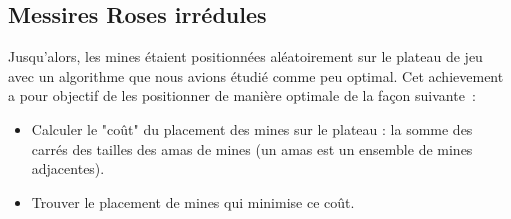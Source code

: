 \subsection*{Messires Roses irrédules}
\label{sec:mri}
Jusqu'alors, les mines étaient positionnées aléatoirement sur le plateau de jeu avec un algorithme que nous avions étudié comme peu optimal. Cet achievement a pour objectif de les positionner de manière optimale de la façon suivante~:
\begin{itemize}
    \setlength\itemsep{0.01em}
    \item Calculer le "coût" du placement des mines sur le plateau : la somme des carrés des tailles des amas de mines (un amas est un ensemble de mines adjacentes).
    \item Trouver le placement de mines qui minimise ce coût.
\end{itemize}
